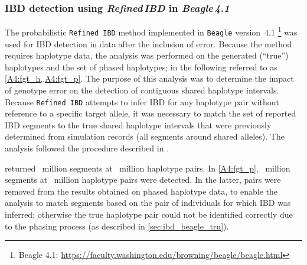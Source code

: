 %

%


%
\subsubsection{IBD detection using \emph{Refined\,IBD} in \emph{Beagle\,4.1}}
%


The probabilistic \texttt{Refined\,IBD} method implemented in \texttt{Beagle} version~4.1 \citep{Browning:2013eh}\footnote{Beagle 4.1: \url{https://faculty.washington.edu/browning/beagle/beagle.html} } was used for IBD detection in data after the inclusion of error.
Because the method requires haplotype data, the analysis was performed on the generated (``true'') haplotypes and the set of phased haplotypes; in the following referred to as \cref{A4:fgt_h,,A4:fgt_p}.
The purpose of this analysis was to determine the impact of genotype error on the detection of contiguous shared haplotype intervals.
Because \texttt{Refined\,IBD} attempts to infer IBD for any haplotype pair without reference to a specific target allele, it was necessary to match the set of reported IBD segments to the true shared haplotype intervals that were previously determined from simulation records (\ie all segments around shared \fk{[2,25]} alleles).
The analysis followed the procedure described in .

 returned ~million segments at ~million haplotype pairs.
In \cref{A4:fgt_p}, ~million segments at ~million haplotype pairs were detected.
In the latter,  pairs were removed from the results obtained on phased haplotype data, to enable the analysis to match segments based on the pair of individuals for which IBD was inferred; otherwise the true haplotype pair could not be identified correctly due to the phasing process (as described in \cref{sec:ibd_beagle_tru}).

%

%

